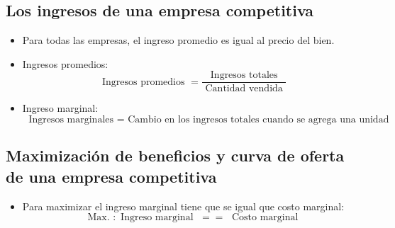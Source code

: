 \documentclass{article}
\begin{document}
\subsection{Los ingresos de una empresa competitiva}
\begin{itemize}
    \item Para todas las empresas, el ingreso promedio es igual al precio del bien.
    \item Ingresos promedios: 
        \[
          \text{ Ingresos promedios } = \frac{\text{ Ingresos totales }}{\text{ Cantidad vendida }} 
        \]
    
    \item Ingreso marginal: 
        \[
            \text{ Ingresos marginales } = \text{ Cambio en los ingresos totales cuando se agrega una unidad }
        \]
\end{itemize}


\subsection{Maximización de beneficios y curva de oferta de una empresa competitiva}
\begin{itemize}
    \item Para maximizar el ingreso marginal tiene que se igual que costo marginal:
        \[
          \text{ Max. }: \text{ Ingreso marginal  } \; == \; \text{ Costo marginal } 
        \]
\end{itemize}
\end{document}
